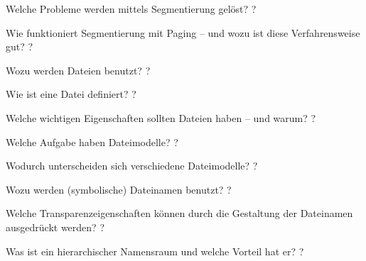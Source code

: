 \documentclass[avery5371]{flashcards}
\begin{document}
\begin{flashcard}[Speichermanagement]{Welche Probleme werden mittels Segmentierung gelöst?}
    ?
\end{flashcard}

\begin{flashcard}[Speichermanagement]{Wie funktioniert Segmentierung mit Paging – und wozu ist diese Verfahrensweise gut?}
    ?
\end{flashcard}

\begin{flashcard}[Dateisysteme]{Wozu werden Dateien benutzt?}
    ?
\end{flashcard}

\begin{flashcard}[Dateisysteme]{Wie ist eine Datei definiert? }
    ?
\end{flashcard}

\begin{flashcard}[Dateisysteme]{Welche wichtigen Eigenschaften sollten Dateien haben – und warum?}
    ?
\end{flashcard}

\begin{flashcard}[Dateisysteme]{Welche Aufgabe haben Dateimodelle?}
    ?
\end{flashcard}

\begin{flashcard}[Dateisysteme]{Wodurch unterscheiden sich verschiedene Dateimodelle? }
    ?
\end{flashcard}

\begin{flashcard}[Dateisysteme]{Wozu werden (symbolische) Dateinamen benutzt?}
    ?
\end{flashcard}

\begin{flashcard}[Dateisysteme]{Welche Transparenzeigenschaften können durch die Gestaltung der Dateinamen ausgedrückt werden? }
    ?
\end{flashcard}

\begin{flashcard}[Dateisysteme]{Was ist ein hierarchischer Namensraum und welche Vorteil hat er?}
    ?
\end{flashcard}
\end{document}
